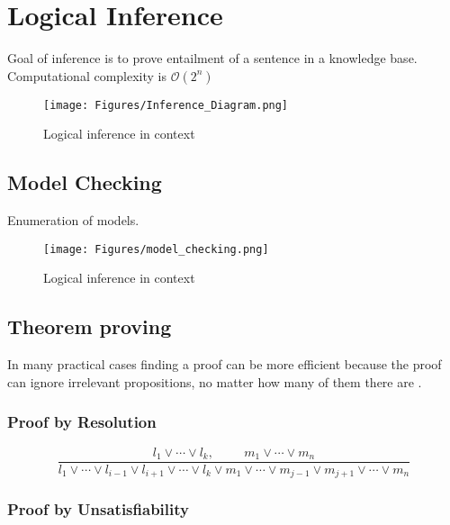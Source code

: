 \section{Logical Inference}
Goal of inference is to prove entailment of a sentence in a knowledge base. Computational complexity is $\mathcal{O}(2^n)$

\begin{figure}[H]
    \centering
    \texttt{[image: Figures/Inference\_Diagram.png]}
    \caption{Logical inference in context}
    \label{fig:entailment}
\end{figure}




\subsection{Model Checking}
Enumeration of models.

\begin{figure}[H]
    \centering
    \texttt{[image: Figures/model\_checking.png]}
    \caption{Logical inference in context}
    \label{fig:entailment}
\end{figure}

\subsection{Theorem proving}

In many practical cases finding a proof can be more efficient because the proof can ignore irrelevant propositions, no
matter how many of them there are \citep{russell2016artificial}.



\subsubsection{Proof by Resolution}



\begin{equation}
\dfrac{ l_1 \vee \cdots \vee l_k,\hspace{1cm}  m_1 \vee \cdots \vee m_n}{    l_1 \vee \cdots \vee l_{i-1} \vee l_{i+1} \vee \cdots \vee l_k  \vee m_1 \vee \cdots \vee m_{j-1} \vee m_{j+1} \vee \cdots \vee m_n }
\label{eq:resolution}
\end{equation}

\subsubsection{Proof by Unsatisfiability}





















